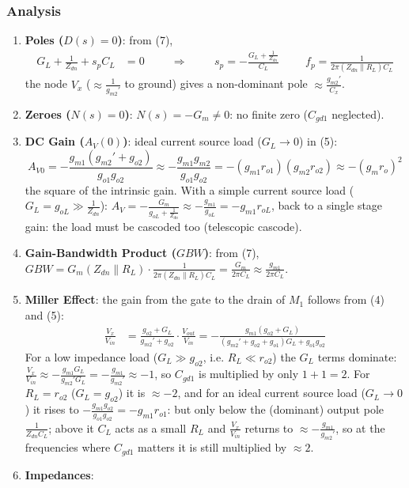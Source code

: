 \subsubsection{Analysis}
\begin{enumerate}
  \item \textbf{Poles (\(D(s) = 0\))}: from (7),
    \begin{align*}
      G_L + \frac{1}{Z_{dn}} + s_p C_L &= 0 \hspace{1cm} \Rightarrow \hspace{1cm} s_p = -\frac{G_L + \frac{1}{Z_{dn}}}{C_L} \hspace{1cm} f_p = \frac{1}{2\pi (Z_{dn} \parallel R_L) C_L}
    \end{align*}
    the node \(V_x\) (\(\approx \frac{1}{g_{m2}'}\) to ground) gives a non-dominant pole
    \(\approx \frac{g_{m2}'}{C_x}\).
  \item \textbf{Zeroes (\(N(s) = 0\))}: \(N(s) = -G_m \neq 0\): no finite zero (\(C_{gd1}\) neglected).
  \item \textbf{DC Gain (\(A_V(0)\))}: ideal current source load (\(G_L \to 0\)) in (5):
    \[
      A_{V0} = -\frac{g_{m1}(g_{m2}' + g_{o2})}{g_{o1} g_{o2}} \approx -\frac{g_{m1} g_{m2}}{g_{o1} g_{o2}} = -(g_{m1} r_{o1})(g_{m2} r_{o2}) \approx -(g_m r_o)^2
    \]
    the square of the intrinsic gain. With a simple current source load
    (\(G_L = g_{oL} \gg \frac{1}{Z_{dn}}\)):
    \(A_V = -\frac{G_m}{g_{oL} + \frac{1}{Z_{dn}}} \approx -\frac{g_{m1}}{g_{oL}} = -g_{m1} r_{oL}\),
    back to a single stage gain: the load must be cascoded too (telescopic cascode).
  \item \textbf{Gain-Bandwidth Product (\(GBW\))}: from (7),
    \(GBW = G_m (Z_{dn} \parallel R_L)\cdot\frac{1}{2\pi (Z_{dn} \parallel R_L) C_L} = \frac{G_m}{2\pi C_L} \approx \frac{g_{m1}}{2\pi C_L}\).
  \item \textbf{Miller Effect}: the gain from the gate to the drain of \(M_1\)
    follows from (4) and (5):
    \begin{align*}
      \frac{V_x}{V_{in}} &= \frac{g_{o2} + G_L}{g_{m2}' + g_{o2}} \cdot \frac{V_{out}}{V_{in}} = -\frac{g_{m1}(g_{o2} + G_L)}{(g_{m2}' + g_{o2} + g_{o1}) G_L + g_{o1} g_{o2}}
    \end{align*}
    For a low impedance load (\(G_L \gg g_{o2}\), i.e. \(R_L \ll r_{o2}\)) the
    \(G_L\) terms dominate:
    \(\frac{V_x}{V_{in}} \approx -\frac{g_{m1} G_L}{g_{m2}' G_L} = -\frac{g_{m1}}{g_{m2}'} \approx -1\),
    so \(C_{gd1}\) is multiplied by only \(1 + 1 = 2\). For \(R_L = r_{o2}\)
    (\(G_L = g_{o2}\)) it is \(\approx -2\), and for an ideal current source load
    (\(G_L \to 0\)) it rises to \(-\frac{g_{m1} g_{o2}}{g_{o1} g_{o2}} = -g_{m1} r_{o1}\):
    but only below the (dominant) output pole \(\frac{1}{Z_{dn} C_L}\); above it
    \(C_L\) acts as a small \(R_L\) and \(\frac{V_x}{V_{in}}\) returns to
    \(\approx -\frac{g_{m1}}{g_{m2}'}\), so at the frequencies where \(C_{gd1}\)
    matters it is still multiplied by \(\approx 2\).
  \item \textbf{Impedances}:

\end{enumerate}
